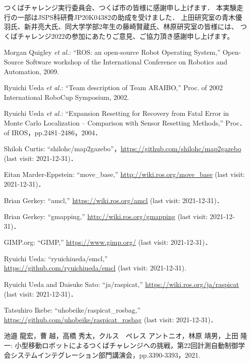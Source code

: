 \documentclass[twocolumn,9pt]{jsproceedings}
\begin{document}
つくばチャレンジ実行委員会、つくば市の皆様に感謝申し上げます．
本実験走行の一部はJSPS科研費JP20K04382の助成を受けました．
上田研究室の青木優羽氏、新井亮大氏、同大学学部2年生の藤崎賢蔵氏、林原研究室の皆様には、
つくばチャレンジ2022の参加にあたりご意見、ご協力頂き感謝申し上げます。


\footnotesize
\begin{thebibliography}{99}
	  Morgan Quigley {\it et al.}: ``ROS: an open-source Robot Operating System,'' 
Open-Source Software workshop of the International Conference on Robotics and Automation, 2009. 

	Ryuichi Ueda {\it et al.}: 
``Team description of Team ARAIBO,'' 
Proc. of 2002 International RoboCup Symposium, 2002. 

	Ryuichi Ueda {\it et al.}: 
  ``Expansion Resetting for Recovery from Fatal Error in Monte Carlo Localization -- Comparison with Sensor Resetting Methods,'' Proc．of IROS，pp.2481--2486，2004．
  
  Shiloh Curtis: ``shilohc/map2gazebo''，\url{https://github.com/shilohc/map2gazebo} (last visit: 2021-12-31)．
  
  Eitan Marder-Eppstein: ``move\_base,'' \url{http://wiki.ros.org/move_base} (last visit: 2021-12-31)．
  
  Brian Gerkey: ``amcl,'' \url{https://wiki.ros.org/amcl} (last visit: 2021-12-31)．

  Brian Gerkey: ``gmapping,'' \url{http://wiki.ros.org/gmapping} (last visit: 2021-12-31)．
  
  GIMP.org: ``GIMP,'' \url{https://www.gimp.org/} (last visit: 2021-12-31)．
  
  Ryuichi Ueda: ``ryuichiueda/emcl,''\\\url{https://github.com/ryuichiueda/emcl} (last visit: 2021-12-31).
  
  Ryuichi Ueda and Daisuke Sato: ``ja/raspicat,'' \url{https://wiki.ros.org/ja/raspicat} (last visit: 2021-12-31)．
  
  Tatsuhiro Ikebe: ``uhobeike/raspicat\_rosbag,'' \url{https://github.com/uhobeike/raspicat_rosbag} (last visit: 2021-12-31)．


 池邉 龍宏，曹 越，高橋 秀太，クルス　ペレス アントニオ，林原 靖男，上田 隆一: 小型移動ロボットによるつくばチャレンジへの挑戦，第22回計測自動制御学会システムインテグレーション部門講演会，pp.3390-3393，2021.


\end{thebibliography}
\end{document}
